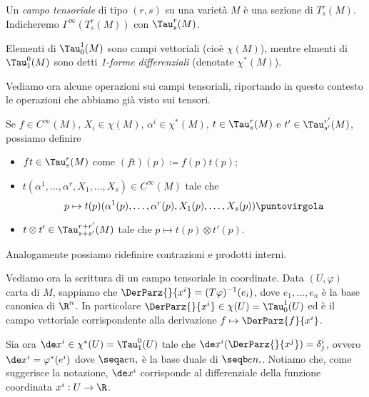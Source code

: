 \begin{definition} 
	Un \emph{campo tensoriale} di tipo $(r,s)$ su una varietà $M$ è una sezione di $T_s^r(M)$. Indicheremo $\Gamma^\infty(T_s^r(M))$ con $\Tau_s^r(M)$. %
	
	Elementi di $\Tau_0^1(M)$ sono campi vettoriali (cioè $\chi(M)$), mentre elmenti di $\Tau_1^0(M)$ sono detti \emph{1-forme differenziali} (denotate $\chi^*(M)$). 
\end{definition}

Vediamo ora alcune operazioni sui campi tensoriali, riportando in questo contesto le operazioni che abbiamo già visto sui tensori. 

Se $f\in C^\infty(M)$, $X_i \in \chi(M)$, $\alpha^i \in \chi^*(M)$, $t \in \Tau_s^r(M)$ e $t' \in \Tau_{s'}^{r'}(M)$, possiamo definire
\begin{itemize}
	\item $ft \in \Tau_s^r(M)$ come $(ft)(p) \coloneqq f(p) t(p)$;
	\item $t(\alpha^1,\ldots,\alpha^r,X_1,\ldots, X_s)\in C^\infty(M)$ tale che
	\begin{equation*}
		p \mapsto t(p)(\alpha^1(p),\ldots,\alpha^r(p),X_1(p),\ldots, X_s(p)) \puntovirgola
	\end{equation*}
	
	\item $t\otimes t' \in \Tau_{s+s'}^{r+r'}(M)$ tale che $p \mapsto t(p)\otimes t'(p)$.
\end{itemize}
Analogamente possiamo ridefinire contrazioni e prodotti interni.

Vediamo ora la scrittura di un campo tensoriale in coordinate. Data $(U,\varphi)$ carta di $M$, sappiamo che $\DerParz{}{x^i} = (T\varphi)^{-1}(e_i)$, dove $e_1,\ldots, e_n$ è la base canonica di $\R^n$.
In particolare $\DerParz{}{x^i} \in \chi(U)=\Tau_0^1(U)$ ed è il campo vettoriale corrispondente alla derivazione $f \mapsto \DerParz{f}{x^i}$. 

Sia ora $\de x^i\in \chi^*(U) = \Tau_1^0(U)$ tale che $\de x^i(\DerParz{}{x^j}) = \delta^i_j$, ovvero $\de x^i = \varphi^*(e^i)$ dove $\seqa en,$ è la base duale di $\seqb en,$.
Notiamo che, come suggerisce la notazione, $\de x^i$ corrisponde al differenziale della funzione coordinata $x^i:U\to \R$.

